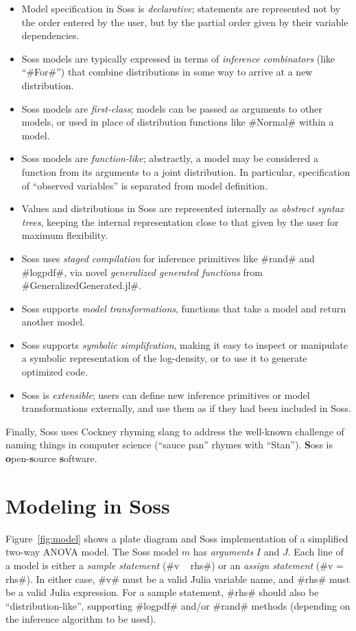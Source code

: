 \documentclass[anonymous=false, %
               format=acmsmall, %
               review=true, %
               screen=true, %
               nonacm=true]{acmart}
\begin{document}
\begin{itemize}
    \item Model specification in Soss is \emph{declarative}; statements are represented not by the order entered by the user, but by the partial order given by their variable dependencies.
    \item Soss models are typically expressed in terms of \emph{inference combinators} (like ``\jl#For#'') that combine distributions in some way to arrive at a new distribution.
    \item Soss models are \emph{first-class}; models can be passed as arguments to other models, or used in place of distribution functions like \jl#Normal# within a model.
    \item Soss models are \emph{function-like}; abstractly, a model may be considered a function from its arguments to a joint distribution. In particular, specification of ``observed variables'' is separated from model definition.
    \item Values and distributions in Soss are represented internally as \emph{abstract syntax trees}, keeping the internal representation close to that given by the user for maximum flexibility.
    \item Soss uses \emph{staged compilation} for inference primitives like \jl#rand# and \jl#logpdf#, via novel \emph{generalized generated functions} from \jl#GeneralizedGenerated.jl#.
    \item Soss supports \emph{model transformations}, functions that take a model and return another model.
    \item Soss supports \emph{symbolic simplifcation}, making it easy to inspect or manipulate a symbolic representation of the log-density, or to use it to generate optimized code.
    \item Soss is \emph{extensible}; users can define new inference primitives or model transformations externally, and use them as if they had been included in Soss.
\end{itemize}

Finally, Soss uses Cockney rhyming slang to address the well-known challenge of naming things in computer science (``sauce pan'' rhymes with ``Stan''). {\bf S}oss is {\bf o}pen-{\bf s}ource {\bf s}oftware.

\section{Modeling in Soss}

Figure~\ref{fig:model} shows a plate diagram and Soss implementation of a simplified two-way ANOVA model. The Soss model $m$ has \emph{arguments} $I$ and $J$. Each line of a model is either a \emph{sample statement} (\jl#v ~ rhs#) or an \emph{assign statement} (\jl#v = rhs#). In either case, \jl#v# must be a valid Julia variable name, and \jl#rhs# must be a valid Julia expression. For a sample statement, \jl#rhs# should also be ``distribution-like'', supporting \jl#logpdf# and/or \jl#rand# methods (depending on the inference algorithm to be used).
\end{document}
